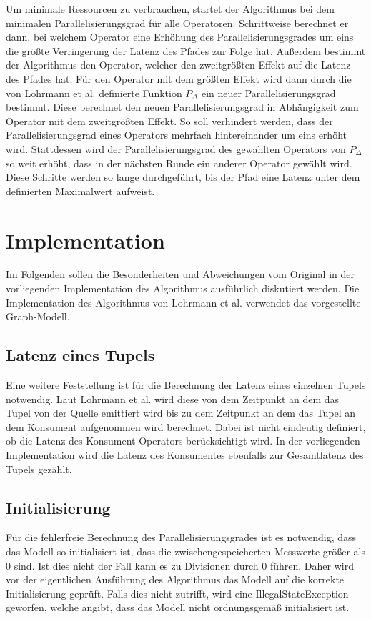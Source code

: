 Um minimale Ressourcen zu verbrauchen, startet der Algorithmus bei dem minimalen Parallelisierungsgrad für alle Operatoren.
Schrittweise berechnet er dann, bei welchem Operator eine Erhöhung des Parallelisierungsgrades um eins die größte Verringerung der Latenz des Pfades zur Folge hat.
Außerdem bestimmt der Algorithmus den Operator, welcher den zweitgrößten Effekt auf die Latenz des Pfades hat.
Für den Operator mit dem größten Effekt wird dann durch die von Lohrmann et al. definierte Funktion \(P_\Delta\) ein neuer Parallelisierungsgrad bestimmt.
Diese berechnet den neuen Parallelisierungsgrad in Abhängigkeit zum Operator mit dem zweitgrößten Effekt.
So soll verhindert werden, dass der Parallelisierungsgrad eines Operators mehrfach hintereinander um eins erhöht wird.
Stattdessen wird der Parallelisierungsgrad des gewählten Operators von \(P_\Delta\) so weit erhöht, dass in der nächsten Runde ein anderer Operator gewählt wird.
Diese Schritte werden so lange durchgeführt, bis der Pfad eine Latenz unter dem definierten Maximalwert aufweist.

\section{Implementation}

Im Folgenden sollen die Besonderheiten und Abweichungen vom Original in der vorliegenden Implementation des Algorithmus ausführlich diskutiert werden.
Die Implementation des Algorithmus von Lohrmann et al. verwendet das vorgestellte Graph-Modell.

\subsection{Latenz eines Tupels}
Eine weitere Feststellung ist für die Berechnung der Latenz eines einzelnen Tupels notwendig.
Laut Lohrmann et al. wird diese von dem Zeitpunkt an dem das Tupel von der Quelle emittiert wird bis zu dem Zeitpunkt an dem das Tupel an dem Konsument aufgenommen wird berechnet. 
Dabei ist nicht eindeutig definiert, ob die Latenz des Konsument-Operators berücksichtigt wird. 
In der vorliegenden Implementation wird die Latenz des Konsumentes ebenfalls zur Gesamtlatenz des Tupels gezählt.

\subsection{Initialisierung}
Für die fehlerfreie Berechnung des Parallelisierungsgrades ist es notwendig, dass das Modell so initialisiert ist, dass die zwischengespeicherten Messwerte größer als 0 sind.
Ist dies nicht der Fall kann es zu Divisionen durch 0 führen.
Daher wird vor der eigentlichen Ausführung des Algorithmus das Modell auf die korrekte Initialisierung geprüft. 
Falls dies nicht zutrifft, wird eine IllegalStateException geworfen, welche angibt, dass das Modell nicht ordnungsgemäß initialisiert ist.

